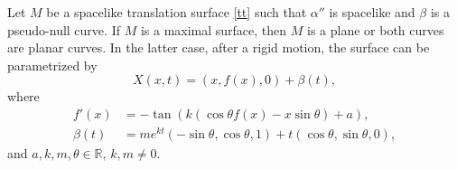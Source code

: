 \documentclass[10pt,a4paper]{amsart}
\def\r{\mathbb R}
\begin{document}
\begin{theorem} \label{t31}
 Let $M$ be a spacelike  translation surface \eqref{tt} such that  $\alpha''$  is spacelike and  $\beta$ is a pseudo-null curve. If $M$ is a maximal surface, then $M$ is a plane or both curves are planar curves. In the latter case,   after a rigid motion, the surface can be parametrized by 
\begin{equation}\label{e11}
X(x,t)=(x,f(x),0)+\beta(t),
\end{equation}
where  
\begin{equation}\label{e12}
 \begin{split}
 f'(x)&=-\tan\left(k(\cos\theta f(x)-x\sin\theta)+a\right), \\ 
 \beta(t)&=me^{kt}(-\sin\theta,\cos\theta,1)+t(\cos\theta,\sin\theta,0),
 \end{split}
 \end{equation}
 and $a,k,m,\theta\in\r$, $k,m\not=0$.
   \end{theorem}
\end{document}
